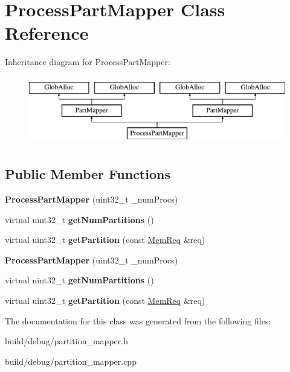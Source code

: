 \hypertarget{classProcessPartMapper}{\section{Process\-Part\-Mapper Class Reference}
\label{classProcessPartMapper}
}
Inheritance diagram for Process\-Part\-Mapper\-:\begin{figure}[H]
\begin{center}
\leavevmode
\includegraphics[height=3.000000cm]{classProcessPartMapper}
\end{center}
\end{figure}
\subsection*{Public Member Functions}
\begin{DoxyCompactItemize}
\item 
\hypertarget{classProcessPartMapper_a0a5d4d9e984ce490c32a6f1a2d846c3e}{{\bfseries Process\-Part\-Mapper} (uint32\-\_\-t \-\_\-num\-Procs)}\label{classProcessPartMapper_a0a5d4d9e984ce490c32a6f1a2d846c3e}

\item 
\hypertarget{classProcessPartMapper_a34ac12ba6242b4dc54fe5026f4d4dde7}{virtual uint32\-\_\-t {\bfseries get\-Num\-Partitions} ()}\label{classProcessPartMapper_a34ac12ba6242b4dc54fe5026f4d4dde7}

\item 
\hypertarget{classProcessPartMapper_a41b337ee1bef5e54d4c4899d3f6fe8ad}{virtual uint32\-\_\-t {\bfseries get\-Partition} (const \hyperlink{structMemReq}{Mem\-Req} \&req)}\label{classProcessPartMapper_a41b337ee1bef5e54d4c4899d3f6fe8ad}

\item 
\hypertarget{classProcessPartMapper_a0a5d4d9e984ce490c32a6f1a2d846c3e}{{\bfseries Process\-Part\-Mapper} (uint32\-\_\-t \-\_\-num\-Procs)}\label{classProcessPartMapper_a0a5d4d9e984ce490c32a6f1a2d846c3e}

\item 
\hypertarget{classProcessPartMapper_a34ac12ba6242b4dc54fe5026f4d4dde7}{virtual uint32\-\_\-t {\bfseries get\-Num\-Partitions} ()}\label{classProcessPartMapper_a34ac12ba6242b4dc54fe5026f4d4dde7}

\item 
\hypertarget{classProcessPartMapper_a5d8d64ffa1c8fc113bdc6ed774fb5eea}{virtual uint32\-\_\-t {\bfseries get\-Partition} (const \hyperlink{structMemReq}{Mem\-Req} \&req)}\label{classProcessPartMapper_a5d8d64ffa1c8fc113bdc6ed774fb5eea}

\end{DoxyCompactItemize}


The documentation for this class was generated from the following files\-:\begin{DoxyCompactItemize}
\item 
build/debug/partition\-\_\-mapper.\-h\item 
build/debug/partition\-\_\-mapper.\-cpp\end{DoxyCompactItemize}
